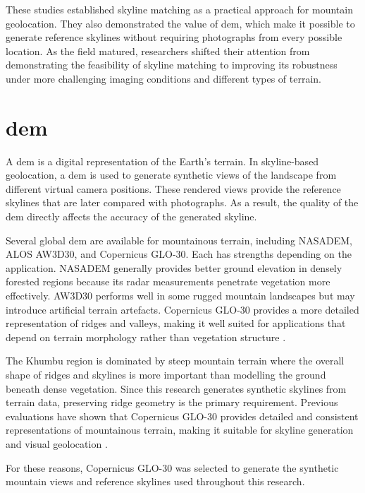 These studies established skyline matching as a practical approach for mountain geolocation. They also demonstrated the value of \Gls{dem}, which make it possible to generate reference skylines without requiring photographs from every possible location. As the field matured, researchers shifted their attention from demonstrating the feasibility of skyline matching to improving its robustness under more challenging imaging conditions and different types of terrain.

\section{\Gls{dem}}

A \Gls{dem} is a digital representation of the Earth's terrain. In skyline-based geolocation, a \Gls{dem} is used to generate synthetic views of the landscape from different virtual camera positions. These rendered views provide the reference skylines that are later compared with photographs. As a result, the quality of the \Gls{dem} directly affects the accuracy of the generated skyline.

Several global \Gls{dem} are available for mountainous terrain, including NASADEM, ALOS AW3D30, and Copernicus GLO-30. Each has strengths depending on the application. NASADEM generally provides better ground elevation in densely forested regions because its radar measurements penetrate vegetation more effectively. AW3D30 performs well in some rugged mountain landscapes but may introduce artificial terrain artefacts. Copernicus GLO-30 provides a more detailed representation of ridges and valleys, making it well suited for applications that depend on terrain morphology rather than vegetation structure \cite{Li2022}.

The Khumbu region is dominated by steep mountain terrain where the overall shape of ridges and skylines is more important than modelling the ground beneath dense vegetation. Since this research generates synthetic skylines from terrain data, preserving ridge geometry is the primary requirement. Previous evaluations have shown that Copernicus GLO-30 provides detailed and consistent representations of mountainous terrain, making it suitable for skyline generation and visual geolocation \cite{Li2022}.

For these reasons, Copernicus GLO-30 was selected to generate the synthetic mountain views and reference skylines used throughout this research.

